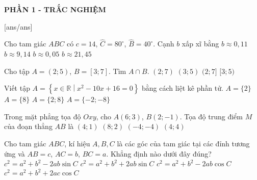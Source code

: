 \begin{center}
	\textbf{PHẦN 1 - TRẮC NGHIỆM}
\end{center}
[ans/ans]
\begin{ex}%
Cho tam giác $ABC$ có $c=14$, $\widehat{C}=80^\circ$, $\widehat{B}=40^\circ$. Cạnh $b$ xấp xĩ bằng
\choice
{$b\approx 0{,}11$}
{\True $b\approx 9{,}14$}
{$b\approx 0{,}05$}
{$b\approx 21{,}45$}
\end{ex}

\begin{ex}%
Cho tập $A=(2;5)$, $B=[3;7]$. Tìm $A\cap B$.
\choice
{$(2;7)$}
{$(3;5)$}
{$(2;7]$}
{\True $[3;5)$}
\loigiai{
Ta có $A\cap B=[3;5)$.
}
\end{ex}

\begin{ex}%
Viết tập $A=\left\{x \in \mathbb{R}\middle| x^2-10 x+16=0\right\}$ bằng cách liệt kê phần tử.
\choice
{$A=\{2\}$}
{$A=\{8\}$}
{\True $A=\{2;8\}$}
{$A=\{-2;-8\}$}
\end{ex}

\begin{ex}%
Trong mặt phẳng tọa độ $Oxy$, cho $A(6;3)$, $B(2;-1)$. Tọa độ trung điểm $M$ của đoạn thẳng $AB$ là
\choice
{\True $(4;1)$}
{$(8;2)$}
{$(-4;-4)$}
{$(4;4)$}
\end{ex}

\begin{ex}%
Cho tam giác $ABC$, kí hiệu $A,B,C$ là các góc của tam giác tại các đỉnh tương ứng và $AB=c$, $AC=b$, $BC=a$. Khẳng định nào dưới đây đúng?
\choice
{$c^2=a^2+b^2-2ab\sin C$}
{$c^2=a^2+b^2+2ab\sin C$}
{\True $c^2=a^2+b^2-2ab\cos C$}
{$c^2=a^2+b^2+2ac\cos C$}
\end{ex}

